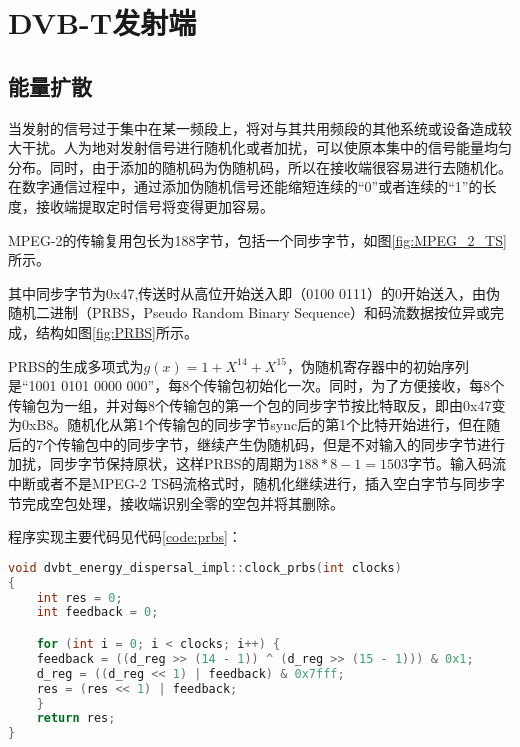 \chapter{DVB-T发射端}
	\section{能量扩散}
		\par 当发射的信号过于集中在某一频段上，将对与其共用频段的其他系统或设备造成较大干扰。人为地对发射信号进行随机化或者加扰，可以使原本集中的信号能量均匀分布。同时，由于添加的随机码为伪随机码，所以在接收端很容易进行去随机化。在数字通信过程中，通过添加伪随机信号还能缩短连续的“0”或者连续的“1”的长度，接收端提取定时信号将变得更加容易。
		\par MPEG-2的传输复用包长为188字节，包括一个同步字节，如图\ref{fig:MPEG_2_TS}所示。\cite{数字电视DVB标准能量扩散的FPGA设计与实现_肖闽进}
		
		\par 其中同步字节为0x47,传送时从高位开始送入即（0100 0111）的0开始送入，由伪随机二进制（PRBS，Pseudo Random Binary Sequence）和码流数据按位异或完成，结构如图\ref{fig:PRBS}所示。
		
		\par PRBS的生成多项式为$g(x)=1+X^{14}+X^{15}$，伪随机寄存器中的初始序列是“1001 0101 0000 000”，每8个传输包初始化一次。同时，为了方便接收，每8个传输包为一组，并对每8个传输包的第一个包的同步字节按比特取反，即由0x47变为0xB8。随机化从第1个传输包的同步字节sync后的第1个比特开始进行，但在随后的7个传输包中的同步字节，继续产生伪随机码，但是不对输入的同步字节进行加扰，同步字节保持原状，这样PRBS的周期为$188*8-1=1503$字节。输入码流中断或者不是MPEG-2 TS码流格式时，随机化继续进行，插入空白字节与同步字节完成空包处理，接收端识别全零的空包并将其删除。
		\par 程序实现主要代码见代码\ref{code:prbs}：
		\begin{lstlisting}[caption = {能量扩散}, label = {code:prbs}, language = C++ ]
void dvbt_energy_dispersal_impl::clock_prbs(int clocks)
{
	int res = 0;
	int feedback = 0;

	for (int i = 0; i < clocks; i++) {
	feedback = ((d_reg >> (14 - 1)) ^ (d_reg >> (15 - 1))) & 0x1;
	d_reg = ((d_reg << 1) | feedback) & 0x7fff;
	res = (res << 1) | feedback;
	}
	return res;
}
		\end{lstlisting}
